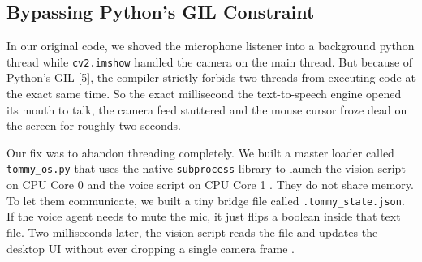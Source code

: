 \documentclass[conference]{IEEEtran}
\begin{document}
\subsection{Bypassing Python's GIL Constraint}
In our original code, we shoved the microphone listener into a background python thread while \texttt{cv2.imshow} handled the camera on the main thread. But because of Python's GIL [5], the compiler strictly forbids two threads from executing code at the exact same time. So the exact millisecond the text-to-speech engine opened its mouth to talk, the camera feed stuttered and the mouse cursor froze dead on the screen for roughly two seconds. 

Our fix was to abandon threading completely. We built a master loader called \texttt{tommy\_os.py} that uses the native \texttt{subprocess} library to launch the vision script on CPU Core 0 and the voice script on CPU Core 1 \cite{b17}. They do not share memory. To let them communicate, we built a tiny bridge file called \texttt{.tommy\_state.json}. If the voice agent needs to mute the mic, it just flips a boolean inside that text file. Two milliseconds later, the vision script reads the file and updates the desktop UI without ever dropping a single camera frame \cite{b6}.
\end{document}
